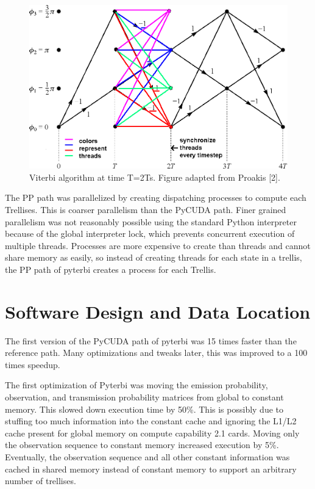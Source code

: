 \documentclass[journal,onecolumn]{IEEEtran}
\begin{document}
        \begin{figure}
            \includegraphics[width=.8\textwidth]{figures/cpmfulltrelliscolored.png}
            \caption{Viterbi algorithm at time T=2Ts. Figure adapted from Proakis [2].}
            \label{fig:cpm}
        \end{figure}

The PP path was parallelized by creating dispatching processes to compute each Trellises. This is coarser parallelism than the PyCUDA path. Finer grained parallelism was not reasonably possible using the standard Python interpreter because of the global interpreter lock, which prevents concurrent execution of multiple threads. Processes are more expensive to create than threads and cannot share memory as easily, so instead of creating threads for each state in a trellis, the PP path of pyterbi creates a process for each Trellis.    

\section{Software Design and Data Location}
The first version of the PyCUDA path of pyterbi was 15 times faster than the reference path. Many optimizations and tweaks later, this was improved to a 100 times speedup. 
        
The first optimization of Pyterbi was moving the emission probability, observation, and transmission probability matrices from global to constant memory. This slowed down execution time by 50\%. This is possibly due to stuffing too much information into the constant cache and ignoring the L1/L2 cache present for global memory on compute capability 2.1 cards. Moving only the observation sequence to constant memory increased execution by 5\%. Eventually, the observation sequence and all other constant information was cached in shared memory instead of constant memory to support an arbitrary number of trellises.
\end{document}

